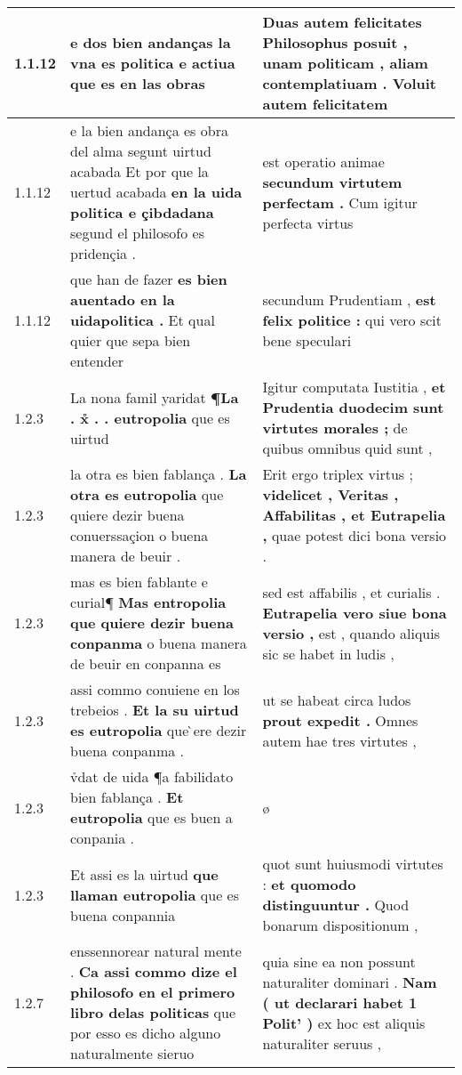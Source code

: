 \begin{tabular}{|p{1cm}|p{6.5cm}|p{6.5cm}|}
1.1.12 & e dos bien andanças \textbf{ la vna es politica e actiua } que es en las obras & Duas autem felicitates Philosophus posuit , \textbf{ unam politicam , aliam contemplatiuam . } Voluit autem felicitatem \\\hline
1.1.12 & e la bien andança es obra del alma segunt uirtud acabada Et por que la uertud acabada \textbf{ en la uida politica e çibdadana } segund el philosofo es pridençia . & est operatio animae \textbf{ secundum virtutem perfectam . } Cum igitur perfecta virtus \\\hline
1.1.12 & que han de fazer \textbf{ es bien auentado en la uidapolitica . } Et qual quier que sepa bien entender & secundum Prudentiam , \textbf{ est felix politice : } qui vero scit bene speculari \\\hline
1.2.3 & La nona famil yaridat \textbf{ ¶La . x̊ . . eutropolia } que es uirtud & Igitur computata Iustitia , \textbf{ et Prudentia duodecim sunt virtutes morales ; } de quibus omnibus quid sunt , \\\hline
1.2.3 & la otra es bien fablança . \textbf{ La otra es eutropolia } que quiere dezir buena conuerssaçion o buena manera de beuir . & Erit ergo triplex virtus ; \textbf{ videlicet , Veritas , Affabilitas , et Eutrapelia , } quae potest dici bona versio . \\\hline
1.2.3 & mas es bien fablante e curial¶ \textbf{ Mas entropolia que quiere dezir buena conpanma } o buena manera de beuir en conpanna es & sed est affabilis , et curialis . \textbf{ Eutrapelia vero siue bona versio , } est , quando aliquis sic se habet in ludis , \\\hline
1.2.3 & assi commo conuiene en los trebeios . \textbf{ Et la su uirtud es eutropolia } que ̀ere dezir buena conpanma . & ut se habeat circa ludos \textbf{ prout expedit . } Omnes autem hae tres virtutes , \\\hline
1.2.3 & v̉dat de uida ¶a fabilidato bien fablança . \textbf{ Et eutropolia } que es buen a conpania . & ø \\\hline
1.2.3 & Et assi es la uirtud \textbf{ que llaman eutropolia } que es buena conpannia & quot sunt huiusmodi virtutes : \textbf{ et quomodo distinguuntur . } Quod bonarum dispositionum , \\\hline
1.2.7 & enssennorear natural mente . \textbf{ Ca assi commo dize el philosofo en el primero libro delas politicas } que por esso es dicho alguno naturalmente sieruo & quia sine ea non possunt naturaliter dominari . \textbf{ Nam ( ut declarari habet 1 Polit’ ) } ex hoc est aliquis naturaliter seruus , \\\hline

\end{tabular}

